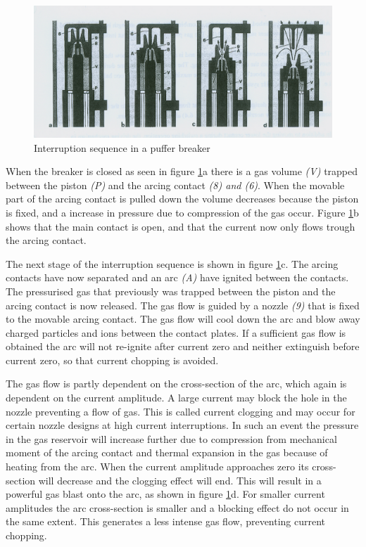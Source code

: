 \documentclass[10pt,a4paper]{article}
\begin{document}
\begin{figure} [h]
\centering
\includegraphics[scale=0.8]{Bilder/Theory/CircutBreakPuff1.png}
\caption{Interruption sequence in a puffer breaker \cite{bib:HVEbreak}} \label{fig:CircutBreakPuff1}
\end{figure}

When the breaker is closed as seen in figure \ref{fig:CircutBreakPuff1}a there is a gas volume \textit{(V)} trapped between the piston \textit{(P)} and the arcing contact \textit{(8) and (6)}. When the movable part of the arcing contact is pulled down the volume decreases because the piston is fixed, and a increase in pressure due to compression of the gas occur. Figure \ref{fig:CircutBreakPuff1}b shows that the main contact is open, and that the current now only flows trough the arcing contact.

The next stage of the interruption sequence is shown in figure \ref{fig:CircutBreakPuff1}c. The arcing contacts have now separated and an arc \textit{(A)} have ignited between the contacts. The pressurised gas that previously was trapped between the piston and the arcing contact is now released. The gas flow is guided by a nozzle \textit{(9)} that is fixed to the movable arcing contact. The gas flow will cool down the arc and blow away charged particles and ions between the contact plates. If a sufficient gas flow is obtained the arc will not re-ignite after current zero and neither extinguish before current zero, so that current chopping is avoided.

The gas flow is partly dependent on the cross-section of the arc, which again is dependent on the current amplitude. A large current may block the hole in the nozzle preventing a flow of gas. This is called current clogging and may occur for certain nozzle designs at high current interruptions. In such an event the pressure in the gas reservoir will increase further due to compression from mechanical moment of the arcing contact and thermal expansion in the gas because of heating from the arc. When the current amplitude approaches zero its cross-section will decrease and the clogging effect will end. This will result in a powerful gas blast onto the arc, as shown in figure \ref{fig:CircutBreakPuff1}d. For smaller current amplitudes the arc cross-section is smaller and a blocking effect do not occur in the same extent. This generates a less intense gas flow, preventing current chopping. 
\end{document}
